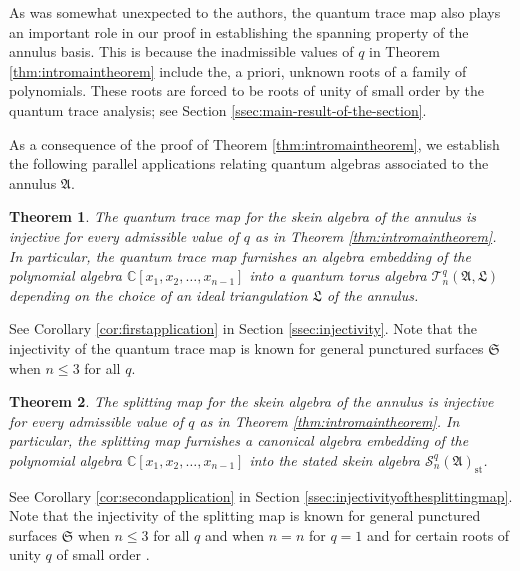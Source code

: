 \documentclass[12pt,
	]{amsart}
\newtheorem{introtheorem}{Theorem}
\theoremstyle{definition}
\newcommand{\mbb}[1]{\mathbb{#1}}
\newcommand{\mcal}[1]{\mathcal{#1}}
\newcommand{\mfrak}[1]{\mathfrak{#1}}
\newcommand{\C}{\mbb{C}}
\newcommand{\ann}{\mfrak{A}}
\newcommand{\surf}{\mfrak{S}}
\newcommand{\idealtriang}{\mfrak{L}}
\begin{document}
As was somewhat unexpected to the authors, the quantum trace map also plays an important role in our proof in establishing the spanning property of the annulus basis. This is because the inadmissible values of $q$ in Theorem \ref{thm:intromaintheorem} include the, a priori, unknown roots of a family of polynomials.  These roots are forced to be roots of unity of small order by the quantum trace analysis; see Section \ref{ssec:main-result-of-the-section}.  

As a consequence of the proof of Theorem \ref{thm:intromaintheorem}, we establish the following parallel applications relating quantum algebras associated to the annulus $\ann$.

\begin{introtheorem}\label{thm:introtheorem2}
The quantum trace map for the skein algebra of the annulus is injective for every admissible value of $q$ as in Theorem {\upshape\ref{thm:intromaintheorem}}.  In particular, the quantum trace map furnishes an algebra embedding of the polynomial algebra $\C[x_1,x_2,\dots,x_{n-1}]$ into a quantum torus algebra $\mcal{T}_n^q(\ann,\idealtriang)$ depending on the choice of an ideal triangulation $\idealtriang$ of the annulus.  
\end{introtheorem}

See Corollary \ref{cor:firstapplication} in Section \ref{ssec:injectivity}.  Note that the injectivity of the quantum trace map is known for general punctured surfaces $\surf$ when $n\leq3$ for all $q$.  

\begin{introtheorem}\label{thm:introtheorem3}
The splitting map \cite{leMR3827810, LeArxiv21} for the skein algebra of the annulus is injective for every admissible value of $q$ as in Theorem {\upshape\ref{thm:intromaintheorem}}.  In particular, the splitting map furnishes a canonical algebra embedding of the polynomial algebra $\C[x_1,x_2,\dots,x_{n-1}]$ into the stated skein algebra $\mcal{S}^q_n(\ann)_\mathrm{st}$.
\end{introtheorem}

See Corollary \ref{cor:secondapplication} in Section \ref{ssec:injectivityofthesplittingmap}.  Note that the injectivity of the splitting map is known for general punctured surfaces $\surf$ when $n\leq3$ for all $q$  \cite{higginsMR4609753, leMR3827810} and when $n=n$ for $q=1$ \cite{korinman2023triangulardecompositioncharactervarieties, wang2023statedslnskeinmodules} and for certain roots of unity $q$ of small order \cite{wang2024statedslnskeinmodulesroots}. 
\end{document}
